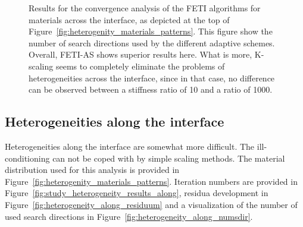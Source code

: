 \begin{figure}
  \begin{center}
    
    \caption[Study of heterogeneities across the interface: \# search directions]{Results for the convergence analysis of the FETI algorithms for materials across the interface, as depicted at the top of Figure~\ref{fig:heterogenity_materials_patterns}. This figure show the number of search directions used by the different adaptive schemes. Overall, FETI-AS shows superior results here. What is more, K-scaling seems to completely eliminate the problems of heterogeneities across the interface, since in that case, no difference can be observed between a stiffness ratio of 10 and a ratio of 1000.}
    \label{fig:heterogeneity_accross_numsdir}
  \end{center}
\end{figure}









\FloatBarrier
\subsection{Heterogeneities along the interface}\label{sec:heterogeneities_along}
Heterogeneities along the interface are somewhat more difficult. The ill-conditioning can not be coped with by simple scaling methods. The material distribution used for this analysis is provided in Figure~\ref{fig:heterogenity_materials_patterns}. Iteration numbers are provided in Figure~\ref{fig:study_heterogeneity_results_along}, residua development in Figure~\ref{fig:heterogeneity_along_residuum} and a visualization of the number of used search directions in Figure~\ref{fig:heterogeneity_along_numsdir}.

